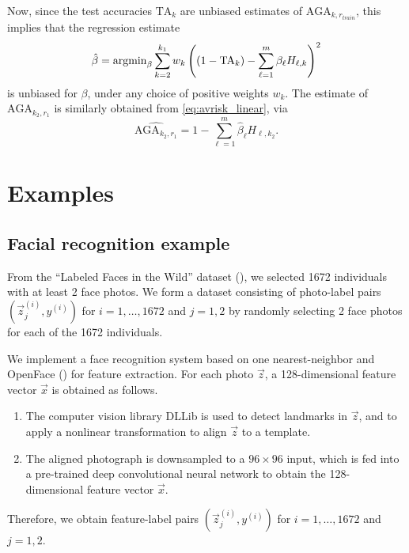 Now, since the test accuracies $\text{TA}_k$ are unbiased estimates of
$\text{AGA}_{k, r_{train}}$, this implies that the regression
estimate
\[
\hat{\beta} = \text{argmin}_\beta \sum_{k=2}^{k_1} w_k \left( (1 - \text{TA}_k) - \sum_{\ell=1}^m \beta_\ell H_{\ell, k}\right)^2
\]
is unbiased for $\beta$, under any choice of positive weights $w_k$.
The estimate of $\text{AGA}_{k_2,r_1}$ is similarly obtained
from \eqref{eq:avrisk_linear}, via
\begin{equation}\label{eq:avrisk_hat}
\widehat{\text{AGA}_{k_2,r_1}} = 1 - \sum_{\ell=1}^m \hat{\beta}_\ell H_{\ell, k_2}.
\end{equation}

\section{Examples}\label{sec:extrapolation_example}

\subsection{Facial recognition example}

From the ``Labeled Faces in the Wild'' dataset (\cite{LFWTech}), we
selected 1672 individuals with at least 2 face photos.  We form a
dataset consisting of photo-label pairs $(\vec{z}_j^{(i)}, y^{(i)})$
for $i = 1,\hdots, 1672$ and $j = 1,2$ by randomly selecting 2 face
photos for each of the 1672 individuals.

We implement a face recognition system based on one nearest-neighbor
and OpenFace (\cite{amos2016openface}) for feature extraction.  For
each photo $\vec{z}$, a 128-dimensional feature vector $\vec{x}$ is
obtained as follows.
\begin{enumerate}
\item The computer vision library DLLib is used to detect landmarks in
  $\vec{z}$, and to apply a nonlinear transformation to align
  $\vec{z}$ to a template.
\item The aligned photograph is downsampled to a $96 \times 96$ input,
  which is fed into a pre-trained deep convolutional neural network to
  obtain the 128-dimensional feature vector $\vec{x}$.
\end{enumerate}
Therefore, we obtain feature-label pairs $(\vec{z}_j^{(i)}, y^{(i)})$
for $i = 1,\hdots, 1672$ and $j = 1,2$.

